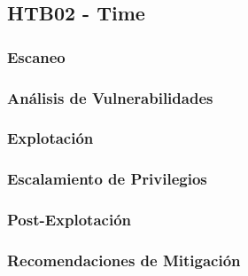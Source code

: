 \subsection{HTB02 - Time}
\subsubsection{Escaneo}
\subsubsection{Análisis de Vulnerabilidades}
\subsubsection{Explotación}
\subsubsection{Escalamiento de Privilegios}
\subsubsection{Post-Explotación}
\subsubsection{Recomendaciones de Mitigación}